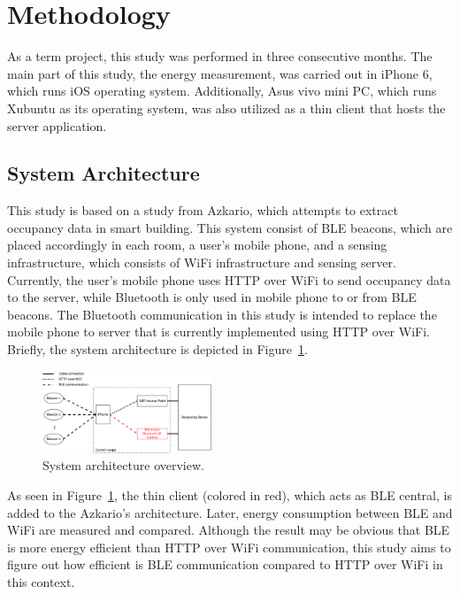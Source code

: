 \documentclass[journal]{vgtc}                %
\begin{document}

\section{Methodology} %
\label{sec:methodology}
As a term project, this study was performed in three consecutive months. The main part of this study, the energy measurement, was carried out in iPhone 6, which runs iOS operating system. Additionally, Asus vivo mini PC, which runs Xubuntu as its operating system, was also utilized as a thin client that hosts the server application.

\subsection{System Architecture} %
\label{sub:system_architecture}
This study is based on a study from Azkario, which attempts to extract occupancy data in smart building. This system consist of BLE beacons, which are placed accordingly in each room, a user's mobile phone, and a sensing infrastructure, which consists of WiFi infrastructure and sensing server. Currently, the user's mobile phone uses HTTP over WiFi to send occupancy data to the server, while Bluetooth is only used in mobile phone to or from BLE beacons. The Bluetooth communication in this study is intended to replace the mobile phone to server that is currently implemented using HTTP over WiFi. Briefly, the system architecture is depicted in Figure~\ref{fig:system-architecture}. 

\begin{figure}
  \centering
    \includegraphics[width=0.45\textwidth]{system-architecture}
  \caption{System architecture overview.}
  \label{fig:system-architecture}
\end{figure}

As seen in Figure~\ref{fig:system-architecture}, the thin client (colored in red), which acts as BLE central, is added to the Azkario's architecture. Later, energy consumption between BLE and WiFi are measured and compared. Although the result may be obvious that BLE is more energy efficient than HTTP over WiFi communication, this study aims to figure out how efficient is BLE communication compared to HTTP over WiFi in this context.
\end{document}

